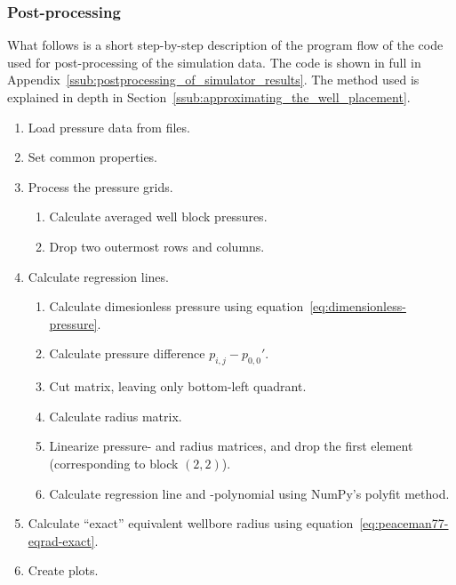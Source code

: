 
\subsubsection{Post-processing} %
\label{ssub:post_processing}
What follows is a short step-by-step description of the program flow of the code used for post-processing of the simulation data. The code is shown in full in Appendix~\ref{ssub:postprocessing_of_simulator_results}. The method used is explained in depth in Section~\ref{ssub:approximating_the_well_placement}.

\begin{enumerate}
    \item Load pressure data from files.
    \item Set common properties.
    \item Process the pressure grids.
    \begin{enumerate}
        \item Calculate averaged well block pressures.
        \item Drop two outermost rows and columns.
    \end{enumerate}
    \item Calculate regression lines.
    \begin{enumerate}
        \item Calculate dimesionless pressure using equation~\eqref{eq:dimensionless-pressure}.
        \item Calculate pressure difference $p_{i,j}-p_{0,0}'$.
        \item Cut matrix, leaving only bottom-left quadrant.
        \item Calculate radius matrix.
        \item Linearize pressure- and radius matrices, and drop the first element (corresponding to block $(2,2)$).
        \item Calculate regression line and -polynomial using NumPy's polyfit method.
    \end{enumerate}
    \item Calculate ``exact'' equivalent wellbore radius using equation~\eqref{eq:peaceman77-eqrad-exact}.
    \item Create plots.
\end{enumerate}


